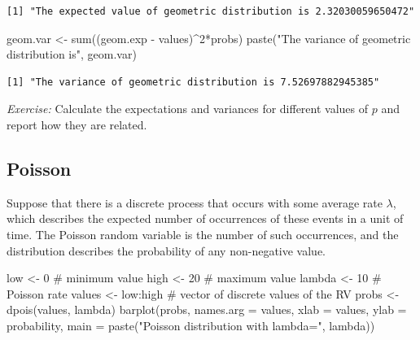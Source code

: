 \documentclass[
  letterpaper,
  DIV=11,
  numbers=noendperiod]{scrreprt}
\newenvironment{Shaded}{\begin{snugshade}}{\end{snugshade}}
\newcommand{\AttributeTok}[1]{\textcolor[rgb]{0.40,0.45,0.13}{#1}}
\newcommand{\CommentTok}[1]{\textcolor[rgb]{0.37,0.37,0.37}{#1}}
\newcommand{\DecValTok}[1]{\textcolor[rgb]{0.68,0.00,0.00}{#1}}
\newcommand{\FunctionTok}[1]{\textcolor[rgb]{0.28,0.35,0.67}{#1}}
\newcommand{\NormalTok}[1]{\textcolor[rgb]{0.00,0.23,0.31}{#1}}
\newcommand{\OtherTok}[1]{\textcolor[rgb]{0.00,0.23,0.31}{#1}}
\newcommand{\SpecialCharTok}[1]{\textcolor[rgb]{0.37,0.37,0.37}{#1}}
\newcommand{\StringTok}[1]{\textcolor[rgb]{0.13,0.47,0.30}{#1}}
\begin{document}
\begin{verbatim}
[1] "The expected value of geometric distribution is 2.32030059650472"
\end{verbatim}

\begin{Shaded}
\begin{Highlighting}[]
\NormalTok{geom.var }\OtherTok{\textless{}{-}} \FunctionTok{sum}\NormalTok{((geom.exp }\SpecialCharTok{{-}}\NormalTok{ values)}\SpecialCharTok{\^{}}\DecValTok{2}\SpecialCharTok{*}\NormalTok{probs)}
\FunctionTok{paste}\NormalTok{(}\StringTok{"The variance of geometric distribution is"}\NormalTok{, geom.var)}
\end{Highlighting}
\end{Shaded}

\begin{verbatim}
[1] "The variance of geometric distribution is 7.52697882945385"
\end{verbatim}

\emph{Exercise:} Calculate the expectations and variances for different
values of \(p\) and report how they are related.

\hypertarget{poisson}{%
\subsection{Poisson}\label{poisson}}

Suppose that there is a discrete process that occurs with some average
rate \(\lambda\), which describes the expected number of occurrences of
these events in a unit of time. The Poisson random variable is the
number of such occurrences, and the distribution describes the
probability of any non-negative value.

\begin{Shaded}
\begin{Highlighting}[]
\NormalTok{low }\OtherTok{\textless{}{-}} \DecValTok{0} \CommentTok{\# minimum value}
\NormalTok{high }\OtherTok{\textless{}{-}} \DecValTok{20} \CommentTok{\# maximum value}
\NormalTok{lambda }\OtherTok{\textless{}{-}} \DecValTok{10} \CommentTok{\# Poisson rate}
\NormalTok{values }\OtherTok{\textless{}{-}}\NormalTok{ low}\SpecialCharTok{:}\NormalTok{high }\CommentTok{\# vector of discrete values of the RV}
\NormalTok{probs }\OtherTok{\textless{}{-}} \FunctionTok{dpois}\NormalTok{(values, lambda)}
\FunctionTok{barplot}\NormalTok{(probs, }\AttributeTok{names.arg =}\NormalTok{ values, }\AttributeTok{xlab =} \StringTok{\textquotesingle{}values\textquotesingle{}}\NormalTok{, }\AttributeTok{ylab =} \StringTok{\textquotesingle{}probability\textquotesingle{}}\NormalTok{,}
        \AttributeTok{main =} \FunctionTok{paste}\NormalTok{(}\StringTok{"Poisson distribution with lambda="}\NormalTok{, lambda))}
\end{Highlighting}
\end{Shaded}
\end{document}
